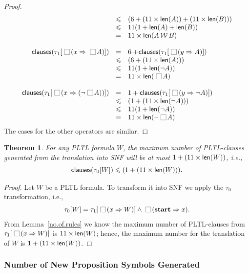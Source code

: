 \documentclass[nohyperref]{acmtrans2f}
\newcommand{\always}{\raisebox{-.2ex}{
                           \mbox{\unitlength=0.9ex
                           \begin{picture}(2,2)
                           \linethickness{0.06ex}
                           \put(0,0){\line(1,0){2}}
                           \put(0,2){\line(1,0){2}}
                           \put(0,0){\line(0,1){2}}
                           \put(2,0){\line(0,1){2}}
                           \end{picture}}}
                          \,}
\def\unless{\hbox{$\,\cal W \,$}}
\let\imp=\Rightarrow
\let\iff=\Leftrightarrow
\def\lstart{\hbox{\rm\bf start}}
\newtheorem{subtheorem}{Theorem}[subsection]
\newcommand{\len}{{\sf len}}
\begin{document}
\begin{proof}
$$\begin{array}{rcl}
     & \leqslant &     (6  + (11 \times \len(A)) + (11 \times \len(B))) \\
      & \leqslant &     11 (1 + \len(A) + \len(B)) \\
      & = &      11 \times \len(A \unless B)\\
\\
{\sf clauses}(\tau_1[\always(x \imp \always A)]) & = & 6 +\! 
     {\sf clauses}(\tau_1[\always(y \imp A)])\\
     & \leqslant &     (6  + (11 \times \len(A)))\\
      & \leqslant &     11 (1 + \len(\neg A)) \\
      & = &      11 \times \len(\always A)\\
%
\\
{\sf clauses}(\tau_1[\always(x \imp (\neg \always A))]) & = & 1 + 
    {\sf clauses}(\tau_1[\always(y \imp \neg A)]) \\
     & \leqslant &     (1  + (11 \times \len(\neg A))) \\
      & \leqslant &     11 (1 + \len(\neg A)) \\
      & = &      11 \times \len(\neg \always A)

\end{array}$$
%
The cases for the other operators are similar.
\end{proof}
\begin{subtheorem}
For any PLTL formula $W$, 
the maximum number of PLTL-clauses generated from the translation
into SNF will be  at most $1 + (11 \times \len(W))$, i.e.,
$$
{\sf clauses}(\tau_0[W]) \leqslant (1 + (11 \times \len(W))).
$$
\end{subtheorem}
\begin{proof}
Let $W$ be a PLTL formula. To transform it into SNF we
apply the $\tau_0$ transformation, i.e.,
$$
\tau_0[W] = \tau_1[\always(x \imp W)] \land \always(\lstart \imp x).
$$
 From Lemma~\ref{no.of.rules} we know the maximum number of PLTL-clauses from
$\tau_1[\always(x \imp W)]$ is $11 \times \len(W)$; hence, the maximum
number for the translation of $W$ is $1 + (11 \times \len(W))$.
\end{proof}


\subsubsection{Number of New Proposition Symbols Generated}
\end{document}
